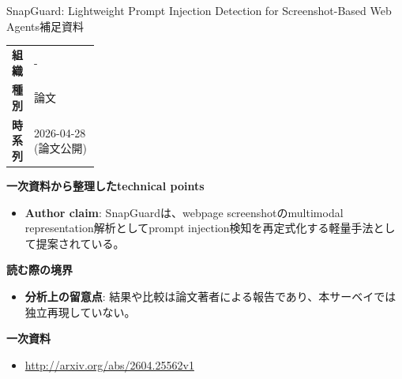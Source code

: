 \begin{technicalnote}{SnapGuard: Lightweight Prompt Injection Detection for Screenshot-Based Web Agents}{補足資料}
\begingroup
\begin{tabularx}{\linewidth}{@{}>{\bfseries}p{0.22\linewidth}X@{}}
組織 & - \\
種別 & 論文 \\
時系列 & 2026-04-28 (論文公開) \\
\end{tabularx}
\smallskip
{\bfseries 一次資料から整理したtechnical points}
\begin{itemize}[leftmargin=1.5em,itemsep=0.35em]
\item \textbf{Author claim}: SnapGuardは、webpage screenshotのmultimodal representation解析としてprompt injection検知を再定式化する軽量手法として提案されている。
\end{itemize}
{\bfseries 読む際の境界}
\begin{itemize}[leftmargin=1.5em,itemsep=0.35em]
\item \textbf{分析上の留意点}: 結果や比較は論文著者による報告であり、本サーベイでは独立再現していない。
\end{itemize}
\begin{samepage}
{\bfseries 一次資料}
\begingroup\sloppy
\begin{itemize}[leftmargin=1.5em,itemsep=0.25em]
\item {\scriptsize\url{http://arxiv.org/abs/2604.25562v1}}
\end{itemize}
\endgroup
\end{samepage}
\endgroup
\end{technicalnote}
\medskip

